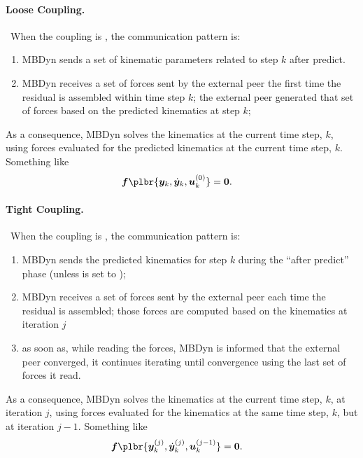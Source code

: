 \paragraph{Loose Coupling.} \
When the coupling is , the communication pattern is:
\begin{enumerate}
\item MBDyn sends a set of kinematic parameters related to step $k$
	after predict.

\item MBDyn receives a set of forces sent by the external peer
	the first time the residual is assembled within time step $k$;
	the external peer generated that set of forces
	based on the predicted kinematics at step $k$;
\end{enumerate}
As a consequence, MBDyn solves the kinematics at the current time step, $k$,
using forces evaluated for the predicted kinematics at the current time step, $k$.
Something like
\begin{align}
	\T{f}\plbr{\T{y}_k, \dot{\T{y}}_k, \T{u}_{k}^{(0)}}
	&=
	\T{0}
	.
\end{align}

\paragraph{Tight Coupling.} \
When the coupling is , the communication pattern is:
\begin{enumerate}
\item MBDyn sends the predicted kinematics for step $k$
	during the ``after predict'' phase
	(unless \kw{send after predict} is set to \kw{no});

\item MBDyn receives a set of forces sent by the external peer
	each time the residual is assembled; those forces are computed
	based on the kinematics at iteration $j$

\item as soon as, while reading the forces, MBDyn is informed that
	the external peer converged, it continues iterating until
	convergence using the last set of forces it read.

\end{enumerate}
As a consequence, MBDyn solves the kinematics at the current time step, $k$,
at iteration $j$,
using forces evaluated for the kinematics at the same time step, $k$,
but at iteration $j-1$.
Something like
\begin{align}
	\T{f}\plbr{\T{y}_k^{(j)}, \dot{\T{y}}_k^{(j)}, \T{u}_k^{(j-1)}}
	&=
	\T{0}
	.
\end{align}




